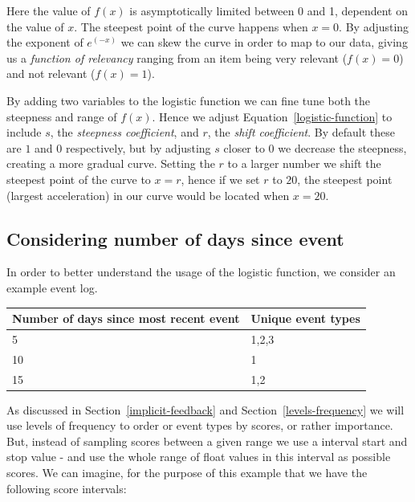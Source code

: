 Here the value of $f(x)$ is asymptotically limited between 0 and 1, dependent
on the value of $x$. The steepest point of the curve happens when $x=0$. By
adjusting the exponent of $e^{(-x)}$ we can skew the curve in order to map to our
data, giving us a \textit{function of relevancy} ranging from an item being
very relevant ($f(x)=0$) and not relevant ($f(x)=1$).

By adding two variables to the logistic function we can fine tune both the
steepness and range of $f(x)$. Hence we adjust Equation~\ref{logistic-function}
to include $s$, the \textit{steepness coefficient}, and $r$, the \textit{shift
coefficient}. By default these are $1$ and $0$ respectively, but by adjusting
$s$ closer to 0 we decrease the steepness, creating a more gradual curve.
Setting the $r$ to a larger number we shift the steepest point of the curve to
$x=r$, hence if we set $r$ to $20$, the steepest point (largest acceleration)
in our curve would be located when $x=20$.

\subsection{Considering number of days since event}

In order to better understand the usage of the logistic function, we consider
an example event log.

\begin{table}[H]
  \centering
  \label{events-example}
  \begin{tabular}{p{4cm}m{3cm}}
    \toprule
    Number of days since most recent event & Unique event types \\
    \midrule
    5 & 1,2,3 \\
    10 & 1 \\
    15 & 1,2 \\
    \bottomrule
  \end{tabular}
\end{table}

As discussed in Section~\ref{implicit-feedback} and
Section~\ref{levels-frequency} we will use levels of frequency to order or
event types by scores, or rather importance. But, instead of sampling scores
between a given range we use a interval start and stop value - and use the
whole range of float values in this interval as possible scores. We can
imagine, for the purpose of this example that we have the following score
intervals:

